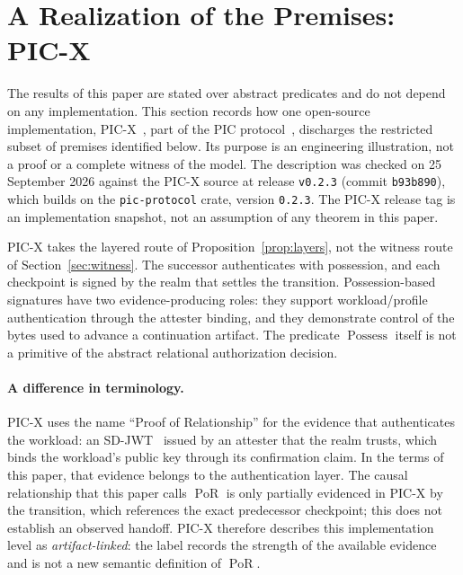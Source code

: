 \documentclass[10pt,twocolumn]{article}
\newcommand{\PoR}{\operatorname{PoR}}
\begin{document}
\section{A Realization of the Premises: PIC-X}
\label{sec:picx}

The results of this paper are stated over abstract predicates and do not depend
on any implementation. This section records how one open-source implementation,
PIC-X~\cite{picx}, part of the PIC protocol~\cite{picprotocol}, discharges the
restricted subset of premises identified below. Its purpose is an engineering
illustration, not a proof or a complete witness of the model. The description was checked on
25 September 2026 against the PIC-X source at release \texttt{v0.2.3}
(commit \texttt{b93b890}), which builds on the \texttt{pic-protocol} crate, version
\texttt{0.2.3}. The PIC-X release tag is an implementation snapshot, not an
assumption of any theorem in this paper.

PIC-X takes the layered route of Proposition~\ref{prop:layers}, not the witness
route of Section~\ref{sec:witness}. The successor authenticates with
possession, and each checkpoint is signed by the realm that settles the
transition. Possession-based signatures have two evidence-producing roles:
they support workload/profile authentication through the attester binding, and
they demonstrate control of the bytes used to advance a continuation artifact.
The predicate \(\operatorname{Possess}\) itself is not a primitive of the
abstract relational authorization decision.

\paragraph{A difference in terminology.}
PIC-X uses the name ``Proof of Relationship'' for the evidence that
authenticates the workload: an SD-JWT~\cite{sdjwt} issued by an attester that
the realm trusts, which binds the workload's public key through its
confirmation claim. In the terms of this paper, that evidence belongs to the
authentication layer. The causal relationship that this paper calls \(\PoR\) is
only partially evidenced in PIC-X by the transition, which references the exact
predecessor checkpoint; this does not establish an observed handoff.
PIC-X therefore describes this implementation level as \emph{artifact-linked}:
the label records the strength of the available evidence and is not a new
semantic definition of \(\PoR\).
\end{document}
